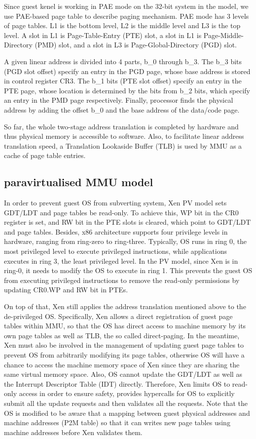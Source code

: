 Since guest kenel is working in PAE mode on the 32-bit system in the model, we use PAE-based page table to describe paging mechanism. PAE mode has 3 levels of page tables. L1 is the bottom level, L2 is the middle level and L3 is the top level. A slot in L1 is Page-Table-Entry (PTE) slot, a slot in L1 is Page-Middle-Directory (PMD) slot, and a slot in L3 is Page-Global-Directory (PGD) slot.

A given linear address is divided into 4 parts, b\_0 through b\_3. The b\_3 bits (PGD slot offset) specify an entry in the PGD page, whose base address is stored in control register CR3. The b\_1 bits (PTE slot offset) specify an entry in the PTE page, whose location is determined by the bits from b\_2 bits, which specify an entry in the PMD page respectively. Finally, processor finds the physical address by adding the offset b\_0 and the base address of the data/code page.

So far, the whole two-stage address translation is completed by hardware and thus physical memory is accessible to software. Also, to facilitate linear address translation speed, a Translation Lookaside Buffer (TLB) is used by MMU as a cache of page table entries.

\subsection{paravirtualised MMU model}

In order to prevent guest OS from subverting system, Xen PV model sets GDT/LDT and page tables be read-only. To achieve this, WP bit in the CR0 register is set, and RW bit in the PTE slots is cleared, which point to GDT/LDT and page tables. Besides, x86 architecture supports four privilege levels in hardware, ranging from ring-zero to ring-three. Typically, OS runs in ring 0, the most privileged level to execute privileged instructions, while applications executes in ring 3, the least privileged level. In the PV model, since Xen is in ring-0, it needs to modify the OS to execute in ring 1. This prevents the guest OS from executing privileged instructions to remove the read-only permissions by updating CR0.WP and RW bit in PTEs.

On top of that, Xen still applies the address translation mentioned above to the de-privileged OS. Specifically, Xen allows a direct registration of guest page tables within MMU, so that the OS has direct access to machine memory by its own page tables as well as TLB, the so called direct-paging. In the meantime, Xen must also be involved in the management of updating guest page tables to prevent OS from arbitrarily modifying its page tables, otherwise OS will have a chance to access the machine memory space of Xen since they are sharing the same virtual memory space. Also, OS cannot update the GDT/LDT as well as the Interrupt Descriptor Table (IDT) directly. Therefore, Xen limits OS to read-only access in order to ensure safety, provides hypercalls for OS to explicitly submit all the update requests and then validates all the requests. Note that the OS is modified to be aware that a mapping between guest physical addresses and machine addresses (P2M table) so that it can writes new page tables using machine addresses before Xen validates them.

